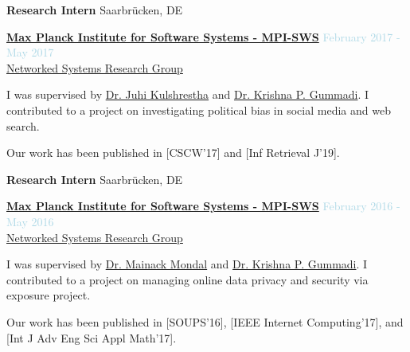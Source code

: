 \medskip



\textbf{Research Intern} \hfill {Saarbrücken, DE}
\begin{outerlist}

\item[] \href{https://www.mpi-sws.org}{\textbf{Max Planck Institute for Software Systems - MPI-SWS}}  \hfill {\textcolor{lightblue}{February 2017 - May 2017}}
\\ \href{https://www.mpi-sws.org/research-areas/social-and-information-systems/}{Networked Systems Research Group}  \medskip 

        \begin{innerlist}[-]
        \item I was supervised by \href{http://www.juhikulshrestha.com}{Dr. Juhi Kulshrestha} and \href{https://people.mpi-sws.org/~gummadi/}{Dr. Krishna P. Gummadi}. I contributed to a project on investigating political bias in social media and web search.
        \item Our work has been published in [CSCW'17] and [Inf Retrieval J'19].
        \end{innerlist}

\end{outerlist}

\medskip

\textbf{Research Intern} \hfill {Saarbrücken, DE}
\begin{outerlist}

\item[] \href{https://www.mpi-sws.org}{\textbf{Max Planck Institute for Software Systems - MPI-SWS}}  \hfill {\textcolor{lightblue}{February 2016 - May 2016}}
\\ \href{https://www.mpi-sws.org/research-areas/social-and-information-systems/}{Networked Systems Research Group}  \medskip 

        \begin{innerlist}[-]
		\item I was supervised by \href{http://cse.iitkgp.ac.in/~mainack/}{Dr. Mainack Mondal} and \href{https://people.mpi-sws.org/~gummadi/}{Dr. Krishna P. Gummadi}. I contributed to a project on managing online data privacy and security via exposure project.
		\item Our work has been published in [SOUPS'16], [IEEE Internet Computing'17], and [Int J Adv Eng Sci Appl Math'17].
        \end{innerlist}

\end{outerlist}

